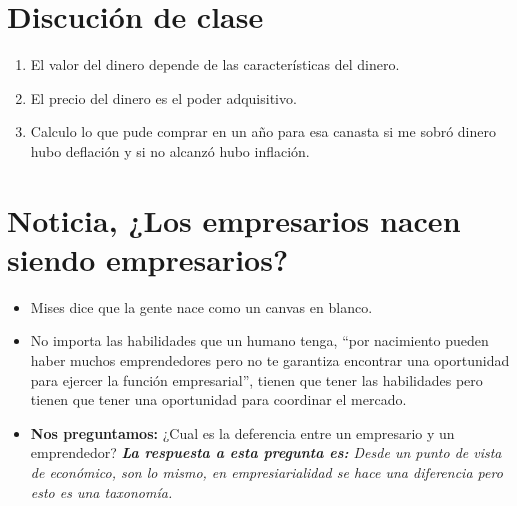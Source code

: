 \section{Discución de clase}
\begin{enumerate}
    \item El valor del dinero depende de las características del dinero.
    \item El precio del dinero es el poder adquisitivo.
    \item Calculo lo que pude comprar en un año para esa canasta si me sobró dinero hubo deflación y si no alcanzó hubo inflación.  
\end{enumerate}


\section{Noticia, ¿Los empresarios nacen siendo empresarios?}
\begin{itemize}
    \item Mises dice que la gente nace como un canvas en blanco.
    \item No importa las habilidades que un humano tenga, ``por nacimiento pueden haber muchos emprendedores pero no te garantiza encontrar una oportunidad para ejercer la función empresarial'', tienen que tener las habilidades pero tienen que tener una oportunidad para coordinar el mercado.
    \item \textbf{Nos preguntamos:} ¿Cual es la deferencia entre un empresario y un emprendedor? \emph{\textbf{La respuesta a esta pregunta es: }Desde un punto de vista de económico, son lo mismo, en empresiarialidad se hace una diferencia pero esto es una taxonomía.}
\end{itemize}


